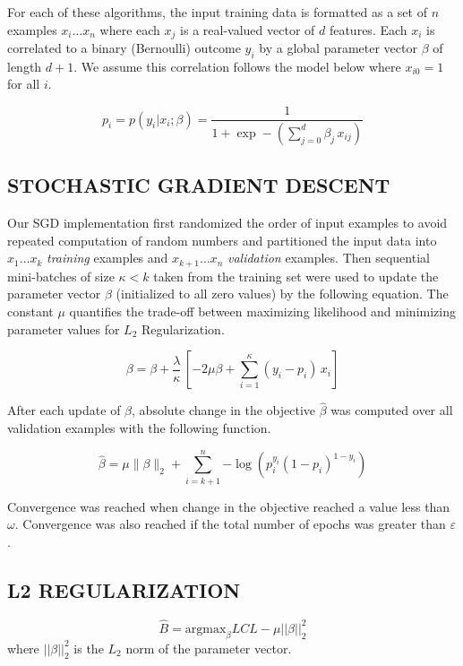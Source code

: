 For each of these algorithms, the input training data is formatted as a set of $n$ examples $x_i \ldots x_n$ where each $x_j$ is a real-valued vector of $d$ features. Each $x_i$ is correlated to a binary (Bernoulli) outcome $y_i$ by a global parameter vector $\beta$ of length $d+1$. We assume this correlation follows the model below where $x_{i0}=1$ for all $i$.

\begin{equation}
    p_i = p(y_i|x_i;\beta) = \frac{1}{1+\exp-(\sum_{j=0}^{d} \beta_j\,x_{ij})}
\end{equation}
   
\subsection{STOCHASTIC GRADIENT DESCENT}
Our SGD implementation first randomized the order of input examples to avoid repeated computation of random numbers and partitioned the input data into $x_1 \ldots x_k$ \emph{training} examples and $x_{k+1} \ldots x_n$ \emph{validation} examples. Then sequential mini-batches of size $\kappa < k$ taken from the training set were used to update the parameter vector $\beta$ (initialized to all zero values) by the following equation. The constant $\mu$ quantifies the trade-off between maximizing likelihood and minimizing parameter values for $L_2$ Regularization.

\begin{equation}
    \beta = \beta + \frac{\lambda}{\kappa}\,[-2 \mu \beta + \sum_{i=1}^{\kappa} (y_i - p_i)\,x_i]
\end{equation}

After each update of $\beta$, absolute change in the objective $\widehat{\beta}$ was computed over all validation examples with the following function.

\begin{equation}
    \widehat{\beta} = \mu \|\beta\|_2 + \sum_{i=k+1}^{n}{-\log(p_i^{y_i}(1 - p_i)^{1-y_i})}
\end{equation}

Convergence was reached when change in the objective reached a value less than $\omega$. Convergence was also reached if the total number of epochs was greater than $\varepsilon$.

\subsection{L2 REGULARIZATION}
\begin{equation}
    \hat{B} = \textrm{argmax}_{\beta} LCL - \mu||\beta||_2^2
\end{equation}
where $||\beta||_2^2$ is the $L_2$ norm of the parameter vector.


